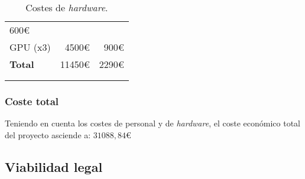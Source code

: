 \begin{longtable}[]{@{}lrr@{}}
\begin{minipage}[t]{0.32\columnwidth}
		600\euro{}\strut
	\end{minipage}\tabularnewline
	\begin{minipage}[t]{0.29\columnwidth}\raggedright\strut
		GPU (x3)\strut
	\end{minipage} & \begin{minipage}[t]{0.18\columnwidth}\raggedright\strut
		4500\euro{}\strut
	\end{minipage} & \begin{minipage}[t]{0.32\columnwidth}\raggedright\strut
		900\euro{}\strut
	\end{minipage}\tabularnewline
	\midrule
	\begin{minipage}[t]{0.29\columnwidth}\raggedright\strut
		\textbf{Total}\strut
	\end{minipage} & \begin{minipage}[t]{0.18\columnwidth}\raggedright\strut
		11450\euro{}\strut
	\end{minipage} & \begin{minipage}[t]{0.32\columnwidth}\raggedright\strut
		2290\euro{}\strut
	\end{minipage}\tabularnewline
	\bottomrule
	\\
	\caption{Costes de \emph{hardware}.}
\end{longtable}

\subsubsection{Coste total}

Teniendo en cuenta los costes de personal y de \textit{hardware}, el coste económico total del proyecto asciende a: $31088,84$\euro


\subsection{Viabilidad legal}


